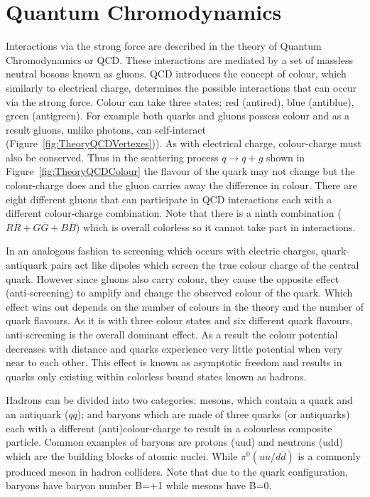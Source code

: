\section{Quantum Chromodynamics}

Interactions via the strong force are described in the theory of Quantum Chromodynamics or QCD. These interactions are mediated by a set of massless neutral bosons known as gluons. QCD introduces the concept of colour, which similarly to electrical charge, determines the possible interactions that can occur via the strong force. Colour can take three states: red (antired), blue (antiblue), green (antigreen). For example both quarks and gluons possess colour and as a result gluons, unlike photons, can self-interact (Figure~\ref{fig:TheoryQCDVertexes})). As with electrical charge, colour-charge must also be conserved. Thus in the scattering process $q\rightarrow q+g$ shown in Figure~\ref{fig:TheoryQCDColour} the flavour of the quark may not change but the colour-charge does and the gluon carries away the difference in colour. There are eight different gluons that can participate in QCD interactions each with a different colour-charge combination. Note that there is a ninth combination ($R\overline{R} + G\overline{G}+B\overline{B}$) which is overall colorless so it cannot take part in interactions.

In an analogous fashion to screening which occurs with electric charges, quark-antiquark pairs act like dipoles which screen the true colour charge of the central quark. However since gluons also carry colour, they cause the opposite effect (anti-screening) to amplify and change the observed colour of the quark. Which effect wins out depends on the number of colours in the theory and the number of quark flavours. As it is with three colour states and six different quark flavours, anti-screening is the overall dominant effect. As a result the colour potential decreases with distance and quarks experience very little potential when very near to each other. This effect is known as asymptotic freedom and results in quarks only existing within colorless bound states known as hadrons.

Hadrons can be divided into two categories: mesons, which contain a quark and an antiquark ($q\overline{q}$); and baryons which are made of three quarks (or antiquarks) each with a different (anti)colour-charge to result in a colourless composite particle. Common examples of baryons are protons (uud) and neutrons (udd) which are the building blocks of atomic nuclei. While $\pi^{0} (u\overline{u}/d\overline{d})$ is a commonly produced meson in hadron colliders. Note that due to the quark configuration, baryons have baryon number B=+1 while mesons have B=0.
  
